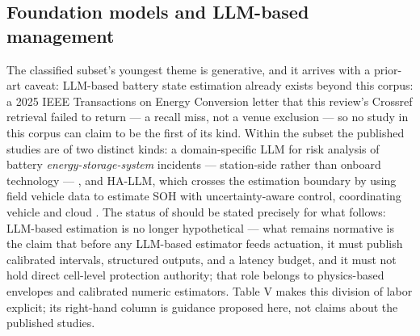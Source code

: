 \documentclass[journal]{IEEEtran}
\begin{document}
\subsection{Foundation models and LLM-based management}

The classified subset's youngest theme is generative, and it arrives with a prior-art caveat: LLM-based battery state estimation already exists beyond this corpus: a 2025 IEEE Transactions on Energy Conversion letter \cite{r29} that this review's Crossref retrieval failed to return --- a recall miss, not a venue exclusion --- so no study in this corpus can claim to be the first of its kind. Within the subset the published studies are of two distinct kinds: a domain-specific LLM for risk analysis of battery \textit{energy-storage-system} incidents --- station-side rather than onboard technology --- \cite{r14}, and HA-LLM, which crosses the estimation boundary by using field vehicle data to estimate SOH with uncertainty-aware control, coordinating vehicle and cloud \cite{r15}. The status of \cite{r15} should be stated precisely for what follows: LLM-based estimation is no longer hypothetical --- what remains normative is the claim that before any LLM-based estimator feeds actuation, it must publish calibrated intervals, structured outputs, and a latency budget, and it must not hold direct cell-level protection authority; that role belongs to physics-based envelopes and calibrated numeric estimators. Table V makes this division of labor explicit; its right-hand column is guidance proposed here, not claims about the published studies.
\end{document}
